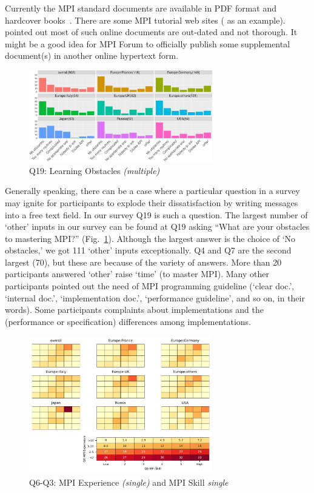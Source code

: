 \documentclass[conference,10pt,letterpaper]{IEEEtran}
\def\myquote#1{`#1'}
\begin{document}
Currently the MPI standard documents are available in PDF format and
hardcover books~\cite{mpi-hardcover}. There are some MPI tutorial web
sites (\cite{mpi-tutorial} as an example). \cite{mpi-tutorial-intro}
pointed out most of such online documents are out-dated and not
thorough. It might be a good idea for MPI Forum to officially publish
some supplemental document(s) in another online hypertext form.

\begin{figure}[htb]
\begin{center}
\includegraphics[width=8cm]{R-scripts/Q19.pdf}
\caption{Q19: Learning Obstacles {\it(multiple)}}
\label{fig:learning-obstacles}
\end{center}
\end{figure}

Generally speaking, there can be a case where a particular question in
a survey may ignite for participants to explode their dissatisfaction
by writing messages into a free text field. In our survey Q19 is
such a question. The 
largest number of \myquote{other} inputs in our survey can be found 
at Q19 asking ``What are your obstacles to mastering MPI?''
(Fig.~\ref{fig:learning-obstacles}). Although the largest answer is
the choice of \myquote{No obstacles,} we got 111 \myquote{other} inputs
exceptionally. Q4 and Q7 are the second largest (70), but these are
because of the variety of answers. 
More than 20 participants answered \myquote{other} raise
\myquote{time} (to master MPI). Many other participants pointed 
out the need of MPI programming guideline (\myquote{clear doc.},
\myquote{internal doc.}, \myquote{implementation 
  doc.}, \myquote{performance guideline}, and so on, in their words).
Some participants complaints about implementations and the
(performance or specification) differences among implementations.  

\begin{figure}[htb]
\begin{center}
\includegraphics[width=8cm]{Figs/Q6-Q3.pdf}
\caption{Q6-Q3: MPI Experience {\it(single)} and MPI Skill {\it single}}
\label{fig:experience-and-skill}
\end{center}
\end{figure}
\end{document}
